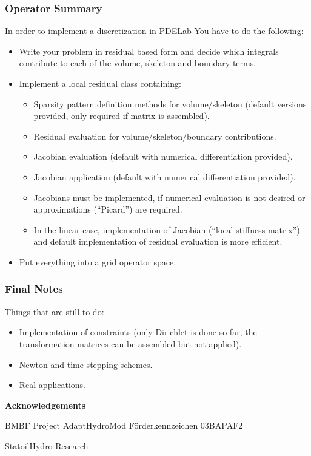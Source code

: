 \begin{frame}
\frametitle<presentation>{Operator Summary}
In order to implement a discretization in PDELab You have to do the
following:
\begin{itemize}
\item Write your problem in residual based form and decide which
integrals contribute to each of the volume, skeleton and boundary
terms.
\item Implement a local residual class containing:
\begin{itemize}
\item Sparsity pattern definition methods for volume/skeleton (default
versions provided, only required if matrix is assembled).
\item Residual evaluation for volume/skeleton/boundary contributions.
\item Jacobian evaluation (default with numerical differentiation
provided).
\item Jacobian application (default with numerical differentiation
provided).
\item Jacobians must be implemented, if numerical evaluation is not
desired or approximations (``Picard'') are required.
\item In the linear case, implementation of Jacobian (``local stiffness
matrix'') and default implementation of residual evaluation is more
efficient.
\end{itemize}
\item Put everything into a grid operator space.
\end{itemize}
\end{frame}

\begin{frame}
\frametitle<presentation>{Final Notes}
Things that are still to do:
\begin{itemize}
\item Implementation of constraints (only Dirichlet is done so far,
the transformation matrices can be assembled but not applied).
\item Newton and time-stepping schemes.
\item Real applications.
\end{itemize}

\medskip
\begin{center}
\textbf{Acknowledgements}

BMBF Project AdaptHydroMod Förderkennzeichen 03BAPAF2

StatoilHydro Research
\end{center}
\end{frame}

\cleardoublepage
